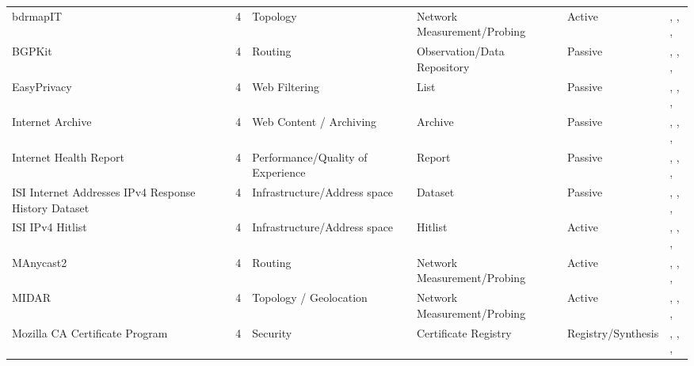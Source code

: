 \begin{table}[h!]
\begin{tabular}{lllllll}
bdrmapIT & \cite{10.1145/3278532.3278538} & 4 & Topology & Network Measurement/Probing & Active & \cite{10.1007/978-3-030-72582-2_14}, \cite{10.1007/978-3-030-98785-5_20}, \cite{10.1007/978-3-030-98785-5_29}, \cite{10.1145/3777912.3809135} \\
BGPKit & \cite{bgpkit} & 4 & Routing & Observation/Data Repository & Passive & \cite{10.1145/3646547.3688444}, \cite{10.1007/978-3-031-85960-1_13}, \cite{10.1145/3777912.3809143}, \cite{10.1145/3777912.3839812} \\
EasyPrivacy & \cite{easyprivacy} & 4 & Web Filtering & List & Passive & \cite{10.1145/3730567.3764427}, \cite{10.1145/3618257.3624823}, \cite{10.1145/3487552.3487855}, \cite{10.1145/3777912.3839794} \\
Internet Archive & \cite{internet-archive} & 4 & Web Content / Archiving & Archive & Passive & \cite{10.1145/3646547.3689010}, \cite{10.1145/3517745.3561437}, \cite{10.1007/978-3-031-28486-1_8}, \cite{10.1145/3777912.3809148} \\
Internet Health Report & \cite{internet_health_report} & 4 & Performance/Quality of Experience & Report & Passive & \cite{10.1145/3517745.3561419}, \cite{10.1007/978-3-031-56252-5_10}, \cite{10.1145/3777912.3809137}, \cite{10.1145/3777912.3839831} \\
ISI Internet Addresses IPv4 Response History Dataset & \cite{isi-ipv4-respone} & 4 & Infrastructure/Address space & Dataset & Passive & \cite{10.1145/3730567.3764781}, \cite{10.1145/3618257.3624831}, \cite{10.1007/978-3-031-56249-5_8}, \cite{10.1145/3777912.3839790} \\
ISI IPv4 Hitlist & \cite{isi-ipv4-hitlist} & 4 & Infrastructure/Address space & Hitlist & Active & \cite{10.1145/3730567.3764484}, \cite{10.1145/3517745.3561421}, \cite{10.1007/978-3-031-85960-1_16}, \cite{10.1145/3777912.3809139} \\
MAnycast2 & \cite{10.1145/3419394.3423646} & 4 & Routing & Network Measurement/Probing & Active & \cite{10.1145/3517745.3561458}, \cite{10.1007/978-3-031-56252-5_1}, \cite{10.1007/978-3-031-56252-5_6}, \cite{10.1007/978-3-031-85960-1_16} \\
MIDAR & \cite{caida_midar} & 4 & Topology / Geolocation & Network Measurement/Probing & Active & \cite{10.1145/3487552.3487812}, \cite{10.1007/978-3-030-98785-5_20}, \cite{10.1007/978-3-031-85960-1_4}, \cite{10.1007/978-3-031-85960-1_6} \\
Mozilla CA Certificate Program & \cite{mozilla-trust-stores} & 4 & Security & Certificate Registry & Registry/Synthesis & \cite{10.1145/3618257.3624815}, \cite{10.1007/978-3-030-72582-2_11}, \cite{10.1007/978-3-031-28486-1_4}, \cite{10.1145/3646547.3688415} \\

\end{tabular}
\end{table}
